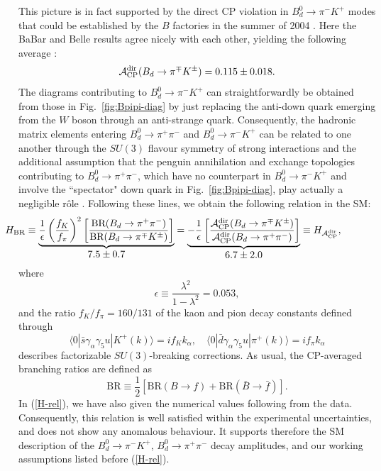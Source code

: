 \documentclass[12pt]{article}
\begin{document}
This picture is in fact supported by the direct CP violation in $B^0_d\to\pi^-K^+$ 
modes that could be established by the $B$ factories in 
the summer of 2004 \cite{CP-B-dir}. Here the BaBar and Belle results agree 
nicely with each other, yielding the following average \cite{HFAG}:
\begin{equation}\label{AdirBdpimKp-exp}
{\cal A}_{\rm CP}^{\rm dir}(B_d\to\pi^\mp K^\pm)=0.115\pm 0.018.
\end{equation}
The diagrams contributing to $B^0_d\to\pi^-K^+$ can straightforwardly be 
obtained from those in Fig.~\ref{fig:Bpipi-diag} by just replacing the anti-down quark
emerging from the $W$ boson through an anti-strange quark. Consequently, the 
hadronic matrix elements entering $B^0_d\to\pi^+\pi^-$ and $B^0_d\to\pi^-K^+$ can be 
related to one another through the $SU(3)$ flavour symmetry of strong interactions
and the additional assumption that the penguin annihilation and exchange topologies
contributing to $B^0_d\to\pi^+\pi^-$, which have no counterpart in 
$B^0_d\to\pi^-K^+$ and involve the ``spectator" down quark in 
Fig.~\ref{fig:Bpipi-diag}, play actually a negligible r\^ole \cite{RF-Bpipi}. Following 
these lines, we obtain the following relation in the SM:
\begin{equation}\label{H-rel}
\hspace*{-1.7truecm}
H_{\rm BR}\equiv\underbrace{\frac{1}{\epsilon}
\left(\frac{f_K}{f_\pi}\right)^2\left[\frac{\mbox{BR}
(B_d\to\pi^+\pi^-)}{\mbox{BR}(B_d\to\pi^\mp K^\pm)}
\right]}_{\mbox{$7.5\pm 0.7$}} =
\underbrace{-\frac{1}{\epsilon}\left[\frac{{\cal A}_{\rm CP}^{\rm dir}(B_d\to\pi^\mp 
K^\pm)}{{\cal A}_{\rm CP}^{\rm dir}(B_d\to\pi^+\pi^-)}
\right]}_{\mbox{$6.7\pm 2.0$}} \equiv H_{{\cal A}_{\rm CP}^{\rm dir}},
\end{equation}
where 
\begin{equation}\label{eps-def}
\epsilon\equiv\frac{\lambda^2}{1-\lambda^2}=0.053, 
\end{equation}
and the ratio $f_K/f_\pi=160/131$ of the kaon and pion decay constants
defined through
\begin{equation}\label{decay-const-def}
\langle 0|\bar s \gamma_\alpha\gamma_5 u|K^+(k)\rangle=
i f_K k_\alpha, \quad
\langle 0|\bar d \gamma_\alpha\gamma_5 u|\pi^+(k)\rangle=
i f_\pi k_\alpha
\end{equation}
describes
factorizable $SU(3)$-breaking corrections. As usual, the CP-averaged 
branching ratios are defined as
\begin{equation}
\mbox{BR}\equiv\frac{1}{2}\left[\mbox{BR}(B\to f)+
\mbox{BR}(\bar B\to \bar f)\right].
\end{equation}
In (\ref{H-rel}), we have also given the
numerical values following from the data. Consequently, this relation 
is well satisfied within the experimental uncertainties, and does not
show any anomalous behaviour. It supports therefore the SM description
of the $B^0_d\to\pi^-K^+$, $B^0_d\to\pi^+\pi^-$ decay amplitudes,
and our working assumptions listed before (\ref{H-rel}). 
\end{document}
